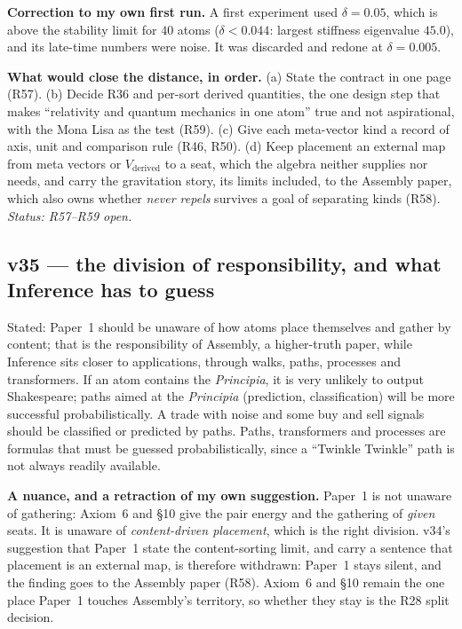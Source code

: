 \documentclass[11pt]{article}
\begin{document}
\textbf{Correction to my own first run.} A first experiment used
$\delta=0.05$, which is above the stability limit for $40$ atoms
($\delta<0.044$: largest stiffness eigenvalue $45.0$), and its late-time
numbers were noise. It was discarded and redone at $\delta=0.005$.

\textbf{What would close the distance, in order.} (a) State the contract in one
page (R57). (b) Decide R36 and per-sort derived quantities, the one design step
that makes ``relativity and quantum mechanics in one atom'' true and not
aspirational, with the Mona Lisa as the test (R59). (c) Give each meta-vector
kind a record of axis, unit and comparison rule (R46, R50). (d) Keep placement
an external map from meta vectors or $V_{\text{derived}}$ to a seat, which the
algebra neither supplies nor needs, and carry the gravitation story, its limits
included, to the Assembly paper, which also owns whether \emph{never repels}
survives a goal of separating kinds (R58).
\emph{Status: R57--R59 open.}


\subsection*{v35 --- the division of responsibility, and what Inference has to guess}
Stated: Paper~1 should be unaware of how atoms place themselves and gather by
content; that is the responsibility of Assembly, a higher-truth paper, while
Inference sits closer to applications, through walks, paths, processes and
transformers. If an atom contains the \emph{Principia}, it is very unlikely to
output Shakespeare; paths aimed at the \emph{Principia} (prediction,
classification) will be more successful probabilistically. A trade with noise
and some buy and sell signals should be classified or predicted by paths. Paths,
transformers and processes are formulas that must be guessed probabilistically,
since a ``Twinkle Twinkle'' path is not always readily available.

\textbf{A nuance, and a retraction of my own suggestion.} Paper~1 is not
unaware of gathering: Axiom~6 and \S10 give the pair energy and the gathering
of \emph{given} seats. It is unaware of \emph{content-driven placement}, which is
the right division. v34's suggestion that Paper~1 state the content-sorting limit,
and carry a sentence that placement is an external map, is therefore withdrawn:
Paper~1 stays silent, and the finding goes to the Assembly paper (R58). Axiom~6
and \S10 remain the one place Paper~1 touches Assembly's territory, so whether they
stay is the R28 split decision.
\end{document}
